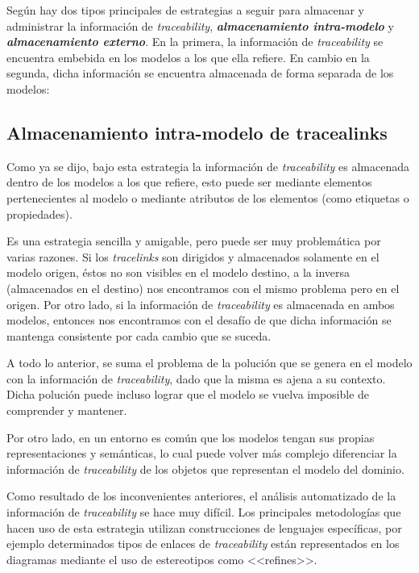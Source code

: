 \documentclass[a4paper,12pt,oneside,spanish]{book}
\begin{document}
Según \cite{DrivalosPaigeFernandesKolovos} hay dos tipos principales de estrategias a seguir para almacenar y administrar la información de \textit{traceability}, \textit{\textbf{almacenamiento intra-modelo}} y \textit{\textbf{almacenamiento externo}}. En la primera, la información de \textit{traceability} se encuentra embebida en los modelos a los que ella refiere. En cambio en la segunda, dicha información se encuentra almacenada de forma separada de los modelos:

\subsection{Almacenamiento intra-modelo de tracealinks}

Como ya se dijo, bajo esta estrategia la información de \textit{traceability} es almacenada dentro de los modelos a los que refiere, esto puede ser mediante elementos pertenecientes al modelo o mediante atributos de los elementos (como etiquetas o propiedades).

Es una estrategia sencilla y amigable, pero puede ser muy problemática por varias razones. Si los \textit{tracelinks} son dirigidos y almacenados solamente en el modelo origen, éstos no son visibles en el modelo destino, a la inversa (almacenados en el destino) nos encontramos con el mismo problema pero en el origen. Por otro lado, si la información de \textit{traceability} es almacenada en ambos modelos, entonces nos encontramos con el desafío de que dicha información se mantenga consistente por cada cambio que se suceda.

A todo lo anterior, se suma el problema de la polución que se genera en el modelo con la información de \textit{traceability}, dado que la misma es ajena a su contexto. Dicha polución puede incluso lograr que el modelo se vuelva imposible de comprender y mantener.

Por otro lado, en un entorno  es común que los modelos tengan sus propias representaciones y semánticas, lo cual puede volver más complejo diferenciar la información de \textit{traceability} de los objetos que representan el modelo del dominio.

Como resultado de los inconvenientes anteriores, el análisis automatizado de la información de \textit{traceability} se hace muy difícil. Los principales metodologías que hacen uso de esta estrategia utilizan construcciones de lenguajes específicas, por ejemplo determinados tipos de enlaces de \textit{traceability} están representados en los diagramas  mediante el uso de estereotipos como \textsf{<<refines>>}.
\end{document}

